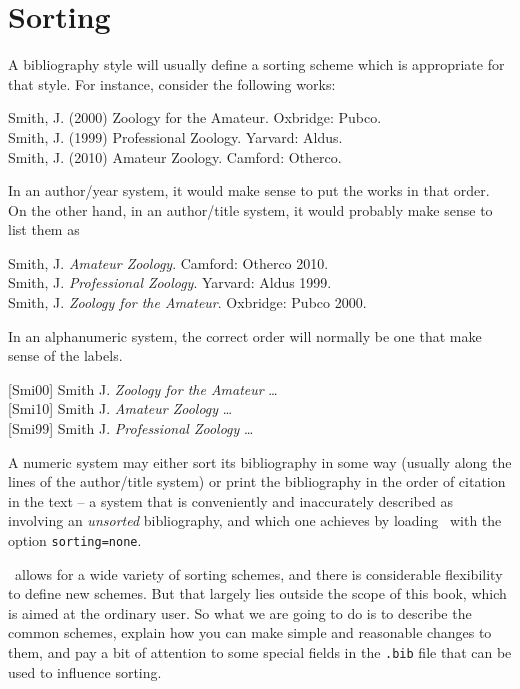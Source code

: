 \chapter{Sorting}\label{ch:sorting}

A bibliography style will usually define a sorting scheme which is
appropriate for that style. For instance, consider the following works:

\medskip
\colorbox{red!40}%
    {Smith, J. (2000) Zoology for the Amateur. Oxbridge: Pubco.}\\
\colorbox{green!40}%
    {Smith, J. (1999) Professional Zoology. Yarvard: Aldus.}\\
\colorbox{blue!40}%
    {Smith, J. (2010) Amateur Zoology. Camford: Otherco.}
\medskip

In an author/year system, it would make sense to put the works in that
order. On the other hand, in an author/title system, it would probably
make sense to list them as

\medskip
\colorbox{blue!40}%
    {Smith, J. \emph{Amateur Zoology}. Camford: Otherco 2010.}\\
\colorbox{green!40}%
    {Smith, J. \emph{Professional Zoology}. Yarvard: Aldus 1999.}\\
\colorbox{red!40}%
    {Smith, J. \emph{Zoology for the Amateur}. Oxbridge: Pubco 2000.}
\medskip

In an alphanumeric system, the correct order will normally be one
that make sense of the labels.

\medskip
\colorbox{red!40}
    {{[}Smi00{]} Smith J. \emph{Zoology for the Amateur} \ldots{}}\\
\colorbox{blue!40}
    {{[}Smi10{]} Smith J. \emph{Amateur Zoology} \ldots{}}\\
\colorbox{green!40}
    {{[}Smi99{]} Smith J. \emph{Professional Zoology} \ldots{}}
\medskip

A numeric system may either sort its bibliography in some way (usually
along the lines of the author/title system) or print the bibliography in
the order of citation in the text -- a system that is conveniently and
inaccurately described as involving an \emph{unsorted} bibliography, and
which one achieves by loading \biblatex\ with the option
\texttt{sorting=none}.

\biblatex\ allows for a wide variety of sorting schemes, and there is
considerable flexibility to define new schemes. But that largely lies
outside the scope of this book, which is aimed at the ordinary user. So
what we are going to do is to describe the common schemes, explain how
you can make simple and reasonable changes to them, and pay a bit of
attention to some special fields in the \texttt{.bib} file that can be
used to influence sorting.

